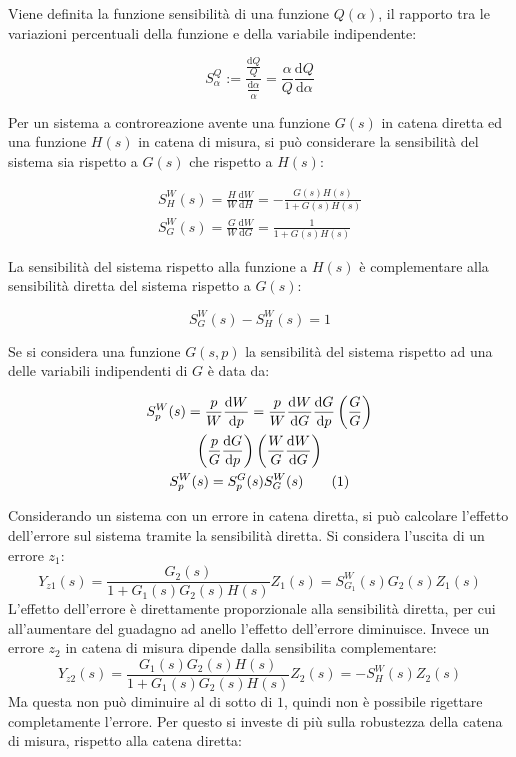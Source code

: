 \documentclass{article}
\numberwithin{equation}{subsection}
\newcommand{\df}{\mathrm{d}}
\newcommand{\tageq}{\tag{\stepcounter{equation}\theequation}}
\begin{document}
Viene definita la funzione sensibilità di una funzione $Q(\alpha)$, il rapporto tra le variazioni percentuali della funzione e della variabile indipendente:

\begin{equation}
    S_{\alpha}^Q:=\displaystyle\frac{\displaystyle\frac{\df Q}{Q}}{\displaystyle\frac{\df\alpha}{\alpha}}=\frac{\alpha}{Q}\frac{\df Q}{\df\alpha}
\end{equation}

Per un sistema a controreazione avente una funzione $G(s)$ in catena diretta ed una funzione $H(s)$ in catena di misura, si può considerare la sensibilità del sistema 
sia rispetto a $G(s)$ che rispetto a $H(s)$:

\begin{gather}
    S_H^W(s)=\displaystyle\frac{H}{W}\frac{\df W}{\df H}=-\frac{G(s)H(s)}{1+G(s)H(s)}\\
    S_G^W(s)=\displaystyle\frac{G}{W}\frac{\df W}{\df G}=\frac{1}{1+G(s)H(s)}
\end{gather}

La sensibilità del sistema rispetto alla funzione a $H(s)$ è complementare alla sensibilità diretta del sistema rispetto a $G(s)$:

\begin{equation}
    S^W_G(s)-S^W_H(s)=1
\end{equation}

Se si considera una funzione $G(s,p)$ la sensibilità del sistema rispetto ad una delle variabili indipendenti di $G$ è data da:

\begin{gather*}
    S^W_p(s)=\displaystyle\frac{p}{W}\frac{\df W}{\df p}=\frac{p}{W}\frac{\df W}{\df G}\frac{\df G}{\df p}\left(\frac{G}{G}\right)\\
    \left(\frac{p}{G}\frac{\df G}{\df p}\right)\left(\frac{W}{G}\frac{\df W}{\df G}\right)\\
    S^W_p(s)=S^G_p(s)S^W_G(s)\tageq
\end{gather*}

Considerando un sistema con un errore in catena diretta, si può calcolare l'effetto dell'errore sul sistema tramite la sensibilità diretta. Si considera l'uscita 
di un errore $z_1$:
\begin{equation}
    Y_{z1}(s)=\displaystyle\frac{G_2(s)}{1+G_1(s)G_2(s)H(s)}Z_1(s)=S^W_{G_1}(s)G_2(s)Z_1(s)
\end{equation}
L'effetto dell'errore è direttamente proporzionale alla sensibilità diretta, per cui all'aumentare del guadagno ad anello l'effetto dell'errore diminuisce.  
Invece un errore $z_2$ in catena di misura dipende dalla sensibilita complementare:
\begin{equation}
    Y_{z2}(s)=\displaystyle\frac{G_1(s)G_2(s)H(s)}{1+G_1(s)G_2(s)H(s)}Z_2(s)=-S^W_H(s)Z_2(s)
\end{equation}
Ma questa non può diminuire al di sotto di $1$, quindi non è possibile rigettare 
completamente l'errore. Per questo si investe di più sulla robustezza della catena di misura, rispetto alla catena diretta: 
\end{document}
